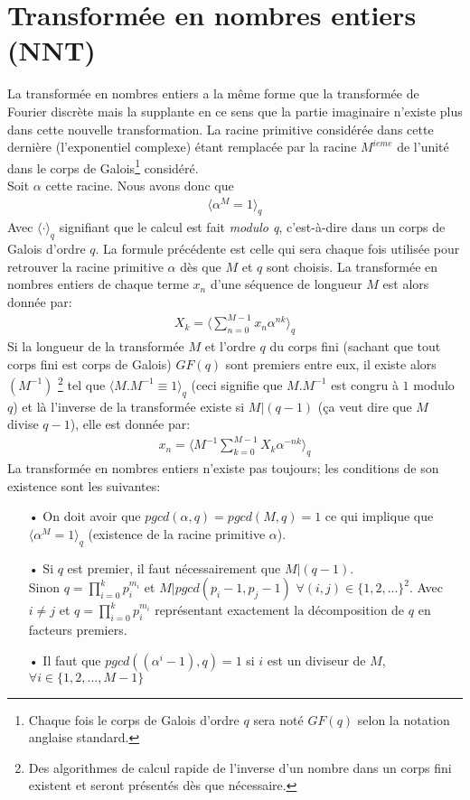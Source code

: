 \section{Transformée en nombres entiers (NNT) \cite{ThAlaedine}}
La transformée en nombres entiers a la même forme que la transformée de Fourier discrète mais la supplante en ce sens que la partie imaginaire n'existe plus dans cette nouvelle transformation. La racine primitive considérée dans cette dernière (l'exponentiel complexe) étant remplacée par la racine $ M^{ieme} $ de l'unité dans le corps de Galois\cite{Galois}\footnote{Chaque fois le corps de Galois d'ordre $ q $ sera noté $ GF(q) $ selon la  notation anglaise standard.} considéré.\\
Soit $ \alpha $ cette racine. Nous avons donc que
\begin{eqnarray}
\langle\alpha^{M} = 1\rangle_{q}
\end{eqnarray}
Avec $ \langle \cdot \rangle_{q} $ signifiant que le calcul est fait \emph{modulo q}, c'est-à-dire dans un corps de Galois d'ordre $ q $. La formule précédente est celle qui sera chaque fois utilisée pour retrouver la racine primitive $ \alpha $ dès que $ M $ et $ q $ sont choisis. La transformée en nombres entiers de chaque terme $ x_{n} $ d'une séquence de longueur $ M $ est alors donnée par:
\begin{eqnarray}\label{TransNombEntiers}
X_{k} = \langle\sum_{n=0}^{M-1}x_{n}\alpha^{nk}\rangle_{q}
\end{eqnarray}
Si la longueur de la transformée $ M $ et l'ordre $ q $ du corps fini (sachant que tout corps fini est corps de Galois)\cite{GaloisD} $ GF(q) $ sont premiers entre eux, il existe alors $ ( M^{-1} ) $ \footnote{Des algorithmes de calcul rapide de l'inverse d'un nombre dans un corps fini existent et seront présentés dès que nécessaire.} tel que $ \langle M.M^{-1} \equiv 1\rangle_{q} $ (ceci signifie que $ M.M^{-1} $ est congru à $ 1 $ modulo $ q $) et là l'inverse de la transformée existe si $ M\vert(q-1) $ (ça veut dire que $ M $ divise $ q-1 $), elle est donnée par:
\begin{eqnarray}\label{TransInvNombEntiers}
x_{n} = \langle M^{-1}\sum_{k=0}^{M-1}X_{k}\alpha^{-nk}\rangle_{q}
\end{eqnarray}
La transformée en nombres entiers n'existe pas toujours; les conditions de son existence sont les suivantes:\newpage
\begin{itemize}
\item[•] On doit avoir que $ pgcd(\alpha,q) = pgcd(M,q) = 1 $ ce qui implique que $ \langle\alpha^{M} = 1\rangle_{q} $ (existence de la racine primitive $ \alpha $).
\item[•] Si $ q $ est premier, il faut nécessairement que $ M\vert(q-1) $.\\ Sinon $ q=\prod_{i=0}^{k}p_{i}^{m_{i}} $ et $ M\vert pgcd(p_{i}-1,p_{j}-1)$  $ \forall(i,j)\in\{1,2,...\}^{2}$. Avec $ i \neq j $ et $ q=\prod_{i=0}^{k}p_{i}^{m_{i}} $ représentant exactement la décomposition de $ q $ en facteurs premiers.
\item[•] Il faut que $ pgcd((\alpha^{i}-1),q) = 1 $ si $ i $ est un diviseur de $ M $, $ \forall i\in\{1,2,...,M-1\} $
\end{itemize}
